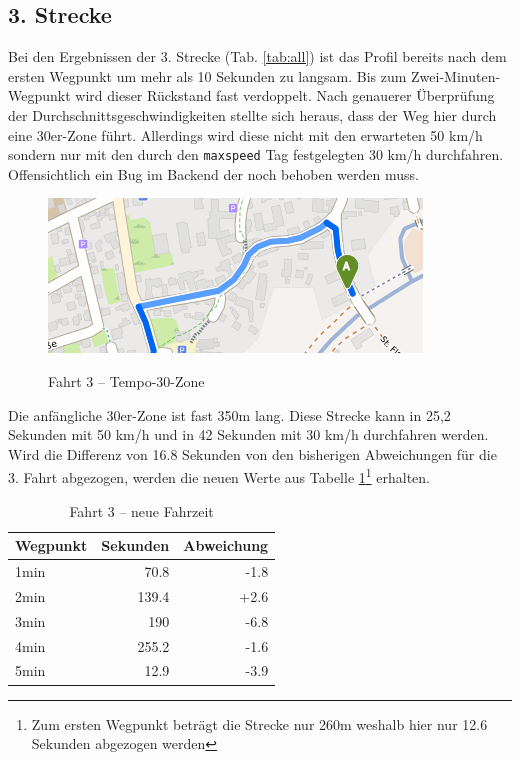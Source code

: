 \documentclass[12pt,a4paper]{article}
\begin{document}
\subsection{3. Strecke}

Bei den Ergebnissen der 3. Strecke (Tab. \ref{tab:all}) ist das Profil bereits nach dem ersten Wegpunkt um mehr als 10 Sekunden zu langsam. Bis zum Zwei-Minuten-Wegpunkt wird dieser Rückstand fast verdoppelt. Nach genauerer Überprüfung der Durchschnittsgeschwindigkeiten stellte sich heraus, dass der Weg hier durch eine 30er-Zone führt. Allerdings wird diese nicht mit den erwarteten 50 km/h sondern nur mit den durch den \lstinline!maxspeed! Tag festgelegten 30 km/h durchfahren. Offensichtlich ein Bug im Backend der noch behoben werden muss.

\begin{figure}[h]
\centering
\caption{Fahrt 3 -- Tempo-30-Zone}
\label{fig:temp30}
\includegraphics[width = 0.60 \textwidth]{../media/Fahrt3_temp30.png} \\
\end{figure}

Die anfängliche 30er-Zone ist fast 350m lang. Diese Strecke kann in 25,2 Sekunden mit 50 km/h und in 42 Sekunden mit 30 km/h durchfahren werden. Wird die Differenz von 16.8 Sekunden von den bisherigen Abweichungen für die 3. Fahrt abgezogen, werden die neuen Werte aus Tabelle \ref{tab:new3}\footnote{Zum ersten Wegpunkt beträgt die Strecke nur 260m weshalb hier nur 12.6 Sekunden abgezogen werden} erhalten.

\begin{table}[h]
\centering
\caption{Fahrt 3 -- neue Fahrzeit}
\label{tab:new3}
\begin{tabular}{|l|r|r|}
\hline
Wegpunkt & Sekunden & Abweichung \\ \hline 
1min & 70.8 & -1.8  \\
2min & 139.4 & +2.6  \\
3min & 190 & -6.8  \\
4min & 255.2 & -1.6  \\
5min & 12.9 & -3.9  \\
\hline
\end{tabular}
\end{table}
\end{document}

